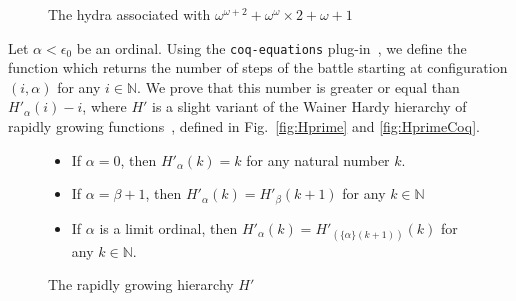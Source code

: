 \documentclass{easychair}
\newcommand{\canonseq}[2]{\mbox{$\{#1\}(#2)$}}
\begin{document}
 

   \begin{figure}[htb]
\centering
{}
\caption{The hydra associated with $\omega^{\omega+2}+\omega^\omega \times 2 + \omega + 1$ \label{fig:iota-example}}

\end{figure}

Let $\alpha<\epsilon_0$ be an ordinal.
Using the \texttt{coq-equations} plug-in~\cite{sozeau:hal-01671777}, we define the function which returns the number of steps of the battle starting at configuration $(i,\alpha)$ for  any $i\in\mathbb{N}$.
We prove that this number is greater or equal than
$H'_\alpha(i)-i$, where $H'$ is a slight variant of the Wainer Hardy hierarchy of rapidly growing functions~\cite{BW85, KS81, Promel2013, Wainer1970}, defined in Fig.~\ref{fig:Hprime} and
\ref{fig:HprimeCoq}.

\begin{figure}[h]
  \centering
  \begin{itemize}
\item If $\alpha=0$, then $H'_\alpha (k)= k$ for any natural number $k$.
\item If $\alpha=\beta+1$, then 
$H'_\alpha(k)=H'_\beta(k+1)$ for any $k \in \mathbb{N}$
\item If $\alpha$ is a limit ordinal, then 
$H'_\alpha(k) = H'_{(\canonseq{\alpha}{k+1})}(k)$ for any $k\in \mathbb{N}$.
\end{itemize}
\caption{The rapidly growing hierarchy $H'$}
\label{Hprime}
\end{figure}
\end{document}
